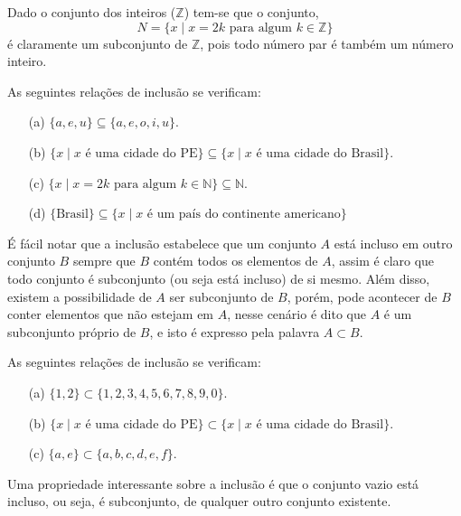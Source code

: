 \begin{exemplo}\label{exe:InclusaoConjuntos1}
  Dado o conjunto dos inteiros ($\mathbb{Z}$) tem-se que o conjunto,  
  $$N = \{x \mid x = 2k \mbox{ para algum } k \in \mathbb{Z}\}$$ 
  é claramente um subconjunto de $\mathbb{Z}$, pois todo número par é também um número inteiro.
\end{exemplo}

\begin{exemplo}\label{exe:InclusaoConjuntos2}
  As seguintes relações de inclusão se verificam:
	\begin{itemize}
		\item[(a)] $\{a, e, u\} \subseteq \{a, e, o, i , u\}$.
		\item[(b)] $\{x \mid x \mbox{ é uma cidade do PE}\} \subseteq \{x \mid x \mbox{ é uma cidade do Brasil}\}$.
		\item[(c)] $\{x \mid x = 2k \mbox{ para algum } k \in \mathbb{N}\} \subseteq \mathbb{N}$.
		\item[(d)] $\{\mbox{Brasil}\} \subseteq \{x \mid x \mbox{ é um país do continente americano}\}$
	\end{itemize}
\end{exemplo}

É fácil notar que a inclusão estabelece que um conjunto $A$ está incluso em outro conjunto $B$ sempre que $B$ contém todos os elementos de $A$, assim é claro que todo conjunto é subconjunto (ou seja está incluso) de si mesmo. Além disso, existem a possibilidade de $A$ ser subconjunto de $B$, porém, pode acontecer de $B$ conter elementos que não estejam em $A$, nesse cenário é dito que $A$ é um subconjunto próprio de $B$, e isto é expresso pela palavra $A \subset B$. 

\begin{exemplo}\label{exe:InclusaoPropria1}
	As seguintes relações de inclusão se verificam:
	\begin{itemize}
    \item[(a)] $\{1, 2\} \subset \{1, 2, 3, 4, 5, 6, 7, 8, 9, 0\}$.
		\item[(b)] $\{x \mid x \mbox{ é uma cidade do PE}\} \subset \{x \mid x \mbox{ é uma cidade do Brasil}\}$.
    \item[(c)] $\{a, e\} \subset \{a, b, c, d, e, f\}$.
	\end{itemize}
\end{exemplo}

Uma propriedade interessante sobre a inclusão é que o conjunto vazio está incluso, ou seja, é subconjunto, de qualquer outro conjunto existente.

